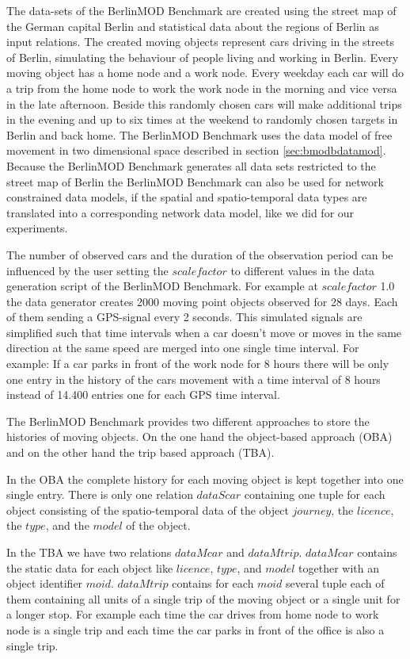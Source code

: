 \documentclass[a4paper]{article}
\newcommand{\bmodb} {BerlinMOD Benchmark}
\begin{document}
The data-sets of the \bmodb{} are created using the street map of the German
capital Berlin \cite{bbike} and statistical data about the regions of Berlin
\cite{bevberlin,berlinstadtatlas} as input relations.
The created moving objects represent cars driving in the streets of Berlin,
simulating the behaviour of people living and working in Berlin.
Every moving object has a home node and a work node. Every weekday each car will
do a trip from the home node to work the work node in the morning and vice versa
in the late afternoon. Beside this randomly chosen cars will make additional
trips in the evening and up to six times at the weekend to randomly chosen
targets in Berlin and back home. The \bmodb{} uses the data model of free movement in two
dimensional space described in section \ref{sec:bmodbdatamod}. Because the \bmodb{}
generates all data sets restricted to the street map of Berlin the \bmodb{} can
also be used for network constrained data models, if the spatial and spatio-temporal
data types are translated into a corresponding network data model, like we did
for our experiments.

The number of observed cars and the duration of the observation period can be
influenced by the user setting the $scalefactor$ to different values in the data
generation script of the \bmodb{}. For example at $scalefactor$ 1.0 the data generator
creates 2000 moving point objects observed for 28 days. Each of them sending a
GPS-signal every 2 seconds. This simulated signals are simplified such that time
intervals when a car doesn't move or moves in the same direction at the same
speed are merged into one single time interval. For example: If a car parks in front
of the work node for 8 hours there will be only one entry in the history of the
cars movement with a time interval of 8 hours instead of 14.400 entries
one for each GPS time interval.

The \bmodb{} provides two different approaches to store the histories of moving
objects. On the one hand the object-based approach (OBA) and on the other hand
the trip based approach (TBA).

In the OBA the complete history for each moving object is kept together into
one single entry. There is only one relation $dataScar$
containing one tuple for each object consisting of the spatio-temporal data of
the object $journey$, the $licence$, the $type$, and the $model$ of the object.

In the TBA we have two relations $dataMcar$ and $dataMtrip$. $dataMcar$ contains
the static data for each object like $licence$, $type$, and $model$ together with
an object identifier $moid$. $dataMtrip$ contains for each $moid$ several tuple
each of them containing all units of a single trip of the moving object or a
single unit for a longer stop. For example each time the car drives from home node
to work node is a single trip and each time the car parks in front of the office
is also a single trip.
\end{document}
